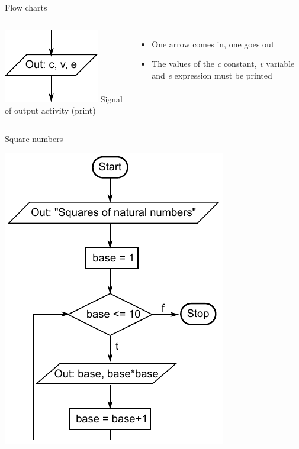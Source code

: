 \documentclass[usenames,dvipsnames,aspectratio=169]{beamer}
\begin{document}
\begin{frame}{Flow charts}
  \begin{columns}[T]
      \includegraphics{./output.pdf}
      Signal of output activity (print)
      \begin{itemize}
        \item One arrow comes in, one goes out
        \item The values of the \emph{c} constant, \emph{v} variable and \emph{e}
expression must be printed
      \end{itemize}
  \end{columns}
\end{frame}

\begin{frame}{Square numbers}
  \begin{center}
    \includegraphics[scale=0.8]{./squares4.pdf}
  \end{center}
\end{frame}
\end{document}
